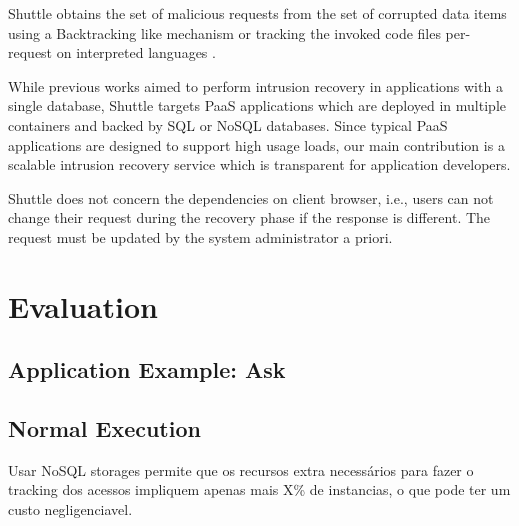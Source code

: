 
Shuttle obtains the set of malicious requests from the set of corrupted data items using a Backtracking \cite{backtracker} like mechanism or tracking the invoked code files per-request on interpreted languages \cite{poirot,warp}. 



While previous works aimed to perform intrusion recovery in applications with a single database, Shuttle targets PaaS applications which are deployed in multiple containers and backed by SQL or NoSQL databases. Since typical PaaS applications are designed to support high usage loads, our main contribution is a scalable intrusion recovery service which is transparent for application developers.


Shuttle does not concern the dependencies on client browser, i.e., users can not change their request during the recovery phase if the response is different. The request must be updated by the system administrator a priori.















\section{Evaluation}




\subsection{Application Example: Ask}



\subsection{Normal Execution}
Usar NoSQL storages permite que os recursos extra necessários para fazer o tracking dos acessos impliquem apenas mais X\% de instancias, o que pode ter um custo negligenciavel.
